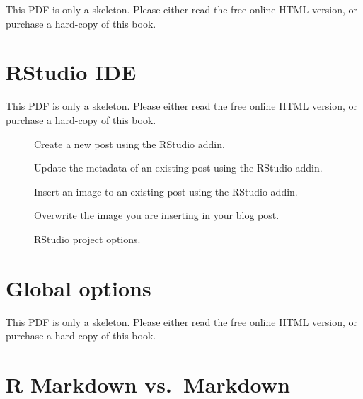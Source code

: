 \documentclass[
  12pt,
]{krantz}
\begin{document}
This PDF is only a skeleton. Please either read the free online HTML version, or purchase a hard-copy of this book.

\section{RStudio IDE}\label{rstudio-ide}

This PDF is only a skeleton. Please either read the free online HTML version, or purchase a hard-copy of this book.

\begin{figure}\caption{Create a new post using the RStudio addin.}\end{figure}

\begin{figure}\caption{Update the metadata of an existing post using the RStudio addin.}\end{figure}

\begin{figure}\caption{Insert an image to an existing post using the RStudio addin.}\end{figure}

\begin{figure}\caption{Overwrite the image you are inserting in your blog post.}\end{figure}

\begin{figure}\caption{RStudio project options.}\end{figure}

\section{\texorpdfstring{Global options}{Global options}}\label{global-options}

This PDF is only a skeleton. Please either read the free online HTML version, or purchase a hard-copy of this book.

\begin{table}\caption{\label{tab:global-options-new}Global options for configured for new blogdown sites.}\end{table}

\begin{table}\caption{\label{tab:global-options-2}Additional global options that affect the behavior of blogdown.}\end{table}

\section{R Markdown vs.~Markdown}\label{output-format}
\end{document}
